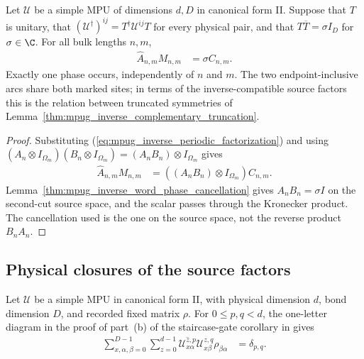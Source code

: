 \begin{lemma}
    \label{thm:mpug_inverse_periodic_one_phase}
    \leanok
    Let $\mathcal U$ be a simple MPU of dimensions $d,D$ in canonical form
    II. Suppose that $T$ is unitary, that
    $(\mathcal U^\dagger)^{ij}=T^\dagger\mathcal U^{ij}T$ for every
    physical pair, and that $T\overline T=\sigma I_D$ for $\sigma\in\C$.
    For all bulk lengths $n,m$,
    \begin{align}
        \widehat A_{n,m}M_{n,m} & =\sigma C_{n,m}.
    \end{align}
    Exactly one phase occurs, independently of $n$ and $m$. The two
    endpoint-inclusive arcs share both marked sites; in terms of the
    inverse-compatible source factors this is the relation between truncated
    symmetries of Lemma~\ref{thm:mpug_inverse_complementary_truncation}.
\end{lemma}
\begin{proof}\leanok
    Substituting (\ref{eq:mpug_inverse_periodic_factorization}) and
    using $(A_n\otimes I_{\Omega_m})(B_n\otimes I_{\Omega_m})
        =(A_nB_n)\otimes I_{\Omega_m}$ gives
    \begin{align}
        \widehat A_{n,m}M_{n,m}
         & =\left((A_nB_n)\otimes I_{\Omega_m}\right)C_{n,m}.
    \end{align}
    Lemma~\ref{thm:mpug_inverse_word_phase_cancellation} gives
    $A_nB_n=\sigma I$ on the second-cut source space, and the scalar passes
    through the Kronecker product. The cancellation used is the one on
    the source space, not the reverse product $B_nA_n$.
\end{proof}

\subsection{Physical closures of the source factors}

\begin{lemma}
    \label{thm:mpug_one_letter_physical_contraction}
    \leanok
    Let $\mathcal U$ be a simple MPU in canonical form II, with physical
    dimension $d$, bond dimension $D$, and recorded fixed matrix $\rho$.
    For $0\leq p,q<d$, the one-letter diagram in the proof of part~(b) of
    the staircase-gate corollary in
    \cite[lines~1013--1030]{FrancoRubio2025MPUGauging} gives
    \begin{align}
        \sum_{x,\alpha,\beta=0}^{D-1}\sum_{z=0}^{d-1}
        \overline{\mathcal U^{z,p}_{x\alpha}}
        \mathcal U^{z,q}_{x\beta}\rho_{\beta\alpha}
         & =\delta_{p,q}.
    \end{align}
\end{lemma}

